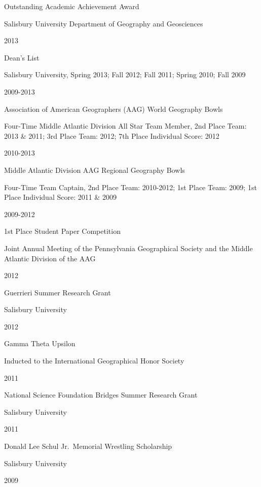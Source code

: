 \documentclass[
]{article}
\begin{document}
Outstanding Academic Achievement Award

Salisbury University Department of Geography and Geosciences

2013

Dean's List

Salisbury University, Spring 2013; Fall 2012; Fall 2011; Spring 2010;
Fall 2009

2009-2013

Association of American Geographers (AAG) World Geography Bowls

Four-Time Middle Atlantic Division All Star Team Member, 2nd Place Team:
2013 \& 2011; 3rd Place Team: 2012; 7th Place Individual Score: 2012

2010-2013

Middle Atlantic Division AAG Regional Geography Bowls

Four-Time Team Captain, 2nd Place Team: 2010-2012; 1st Place Team: 2009;
1st Place Individual Score: 2011 \& 2009

2009-2012

1st Place Student Paper Competition

Joint Annual Meeting of the Pennsylvania Geographical Society and the
Middle Atlantic Division of the AAG

2012

Guerrieri Summer Research Grant

Salisbury University

2012

Gamma Theta Upsilon

Inducted to the International Geographical Honor Society

2011

National Science Foundation Bridges Summer Research Grant

Salisbury University

2011

Donald Lee Schul Jr.~Memorial Wrestling Scholarship

Salisbury University

2009
\end{document}
